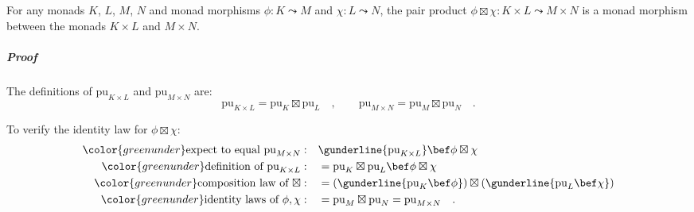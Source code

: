 For any monads $K$, $L$, $M$, $N$ and monad morphisms $\phi:K\leadsto M$
and $\chi:L\leadsto N$, the pair product $\phi\boxtimes\chi:K\times L\leadsto M\times N$
is a monad morphism between the monads $K\times L$ and $M\times N$.

\subparagraph{Proof}

The definitions of $\text{pu}_{K\times L}$ and $\text{pu}_{M\times N}$
are:
\[
\text{pu}_{K\times L}=\text{pu}_{K}\boxtimes\text{pu}_{L}\quad,\quad\quad\text{pu}_{M\times N}=\text{pu}_{M}\boxtimes\text{pu}_{N}\quad.
\]

To verify the identity law for $\phi\boxtimes\chi$:
\begin{align*}
{\color{greenunder}\text{expect to equal }\text{pu}_{M\times N}:}\quad & \gunderline{\text{pu}_{K\times L}}\bef\phi\boxtimes\chi\\
{\color{greenunder}\text{definition of }\text{pu}_{K\times L}:}\quad & =\text{pu}_{K}\boxtimes\text{pu}_{L}\bef\phi\boxtimes\chi\\
{\color{greenunder}\text{composition law of }\boxtimes:}\quad & =(\gunderline{\text{pu}_{K}\bef\phi})\boxtimes(\gunderline{\text{pu}_{L}\bef\chi})\\
{\color{greenunder}\text{identity laws of }\phi,\chi:}\quad & =\text{pu}_{M}\boxtimes\text{pu}_{N}=\text{pu}_{M\times N}\quad.
\end{align*}

